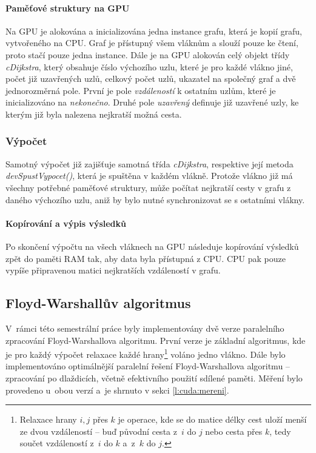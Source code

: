 \paragraph{Paměťové struktury na GPU}
Na GPU je alokována a inicializována jedna instance grafu, která je kopií grafu, vytvořeného na CPU. Graf je přístupný všem vláknům a slouží pouze ke čtení, proto stačí pouze jedna instance. Dále je na GPU alokován celý objekt třídy \textit{cDijkstra}, který obsahuje číslo výchozího uzlu, které je pro každé vlákno jiné, počet již uzavřených uzlů, celkový počet uzlů, ukazatel na společný graf a dvě jednorozměrná pole. První je pole \textit{vzdáleností} k ostatním uzlům, které je inicializováno na \textit{nekonečno}. Druhé pole \textit{uzavřený} definuje již uzavřené uzly, ke kterým již byla nalezena nejkratší možná cesta.

\subsubsection{Výpočet}
Samotný výpočet již zajišťuje samotná třída \textit{cDijkstra}, respektive její metoda \textit{devSpustVypocet()}, která je spuštěna v každém vlákně. Protože vlákno již má všechny potřebné paměťové struktury, může počítat nejkratší cesty v grafu z daného výchozího uzlu, aniž by bylo nutné synchronizovat se s ostatními vlákny.

\paragraph{Kopírování a výpis výsledků}
Po skončení výpočtu na všech vláknech na GPU následuje kopírování výsledků zpět do paměti RAM tak, aby data byla přístupná z CPU. CPU pak pouze vypíše připravenou matici nejkratších vzdáleností v grafu.


\subsection{Floyd-Warshallův algoritmus}
V~rámci této semestrální práce byly implementovány dvě verze paralelního zpracování Floyd-Warshallova algoritmu. 
První verze je základní algoritmus, kde je pro každý výpočet relaxace každé hrany\footnote{Relaxace hrany $i,j$ přes $k$ je operace, 
kde se do matice délky cest uloží menší ze dvou vzdáleností -- buď původní cesta z~$i$ do $j$ nebo cesta
přes $k$, tedy součet vzdáleností z~$i$ do $k$ a~z~$k$ do $j$.} voláno jedno vlákno. Dále bylo implementováno 
optimálnější paralelní řešení Floyd-Warshallova algoritmu -- zpracování po dlaždicích, včetně efektivního použití sdílené paměti.
Měření bylo provedeno u~obou verzí a~je shrnuto v sekci \ref{l:cuda:mereni}.

